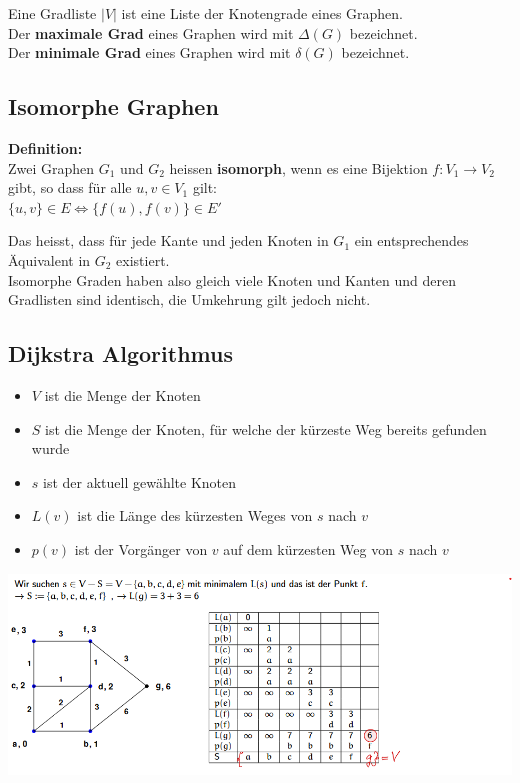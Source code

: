 \documentclass[12pt]{scrartcl}
\begin{document}
Eine Gradliste $|V|$ ist eine Liste der Knotengrade eines Graphen.\\

Der \textbf{maximale Grad} eines Graphen wird mit $\Delta (G)$ bezeichnet.\\
Der \textbf{minimale Grad} eines Graphen wird mit $\delta (G)$ bezeichnet.\\



\subsection{Isomorphe Graphen}
\textbf{Definition:}\\
Zwei Graphen $G_1$ und $G_2$ heissen \textbf{isomorph}, wenn es eine Bijektion $f: V_1 \rightarrow V_2$ gibt, so dass für alle $u,v \in V_1$ gilt:\\
$\{u,v\} \in E \Longleftrightarrow \{f(u),f(v)\} \in E'$

Das heisst, dass für jede Kante und jeden Knoten in $G_1$ ein entsprechendes Äquivalent in $G_2$ existiert.\\

Isomorphe Graden haben also gleich viele Knoten und Kanten und deren Gradlisten sind identisch, die Umkehrung gilt jedoch nicht.


\newpage
\subsection{Dijkstra Algorithmus}
\begin{itemize}
    \item $V$ ist die Menge der Knoten
    \item $S$ ist die Menge der Knoten, für welche der kürzeste Weg bereits gefunden wurde
    \item $s$ ist der aktuell gewählte Knoten
    \item $L(v)$ ist die Länge des kürzesten Weges von $s$ nach $v$
    \item $p(v)$ ist der Vorgänger von $v$ auf dem kürzesten Weg von $s$ nach $v$
\end{itemize}
\includegraphics[width=17cm]{img/dijkstra_algorithmus.png}
\end{document}
